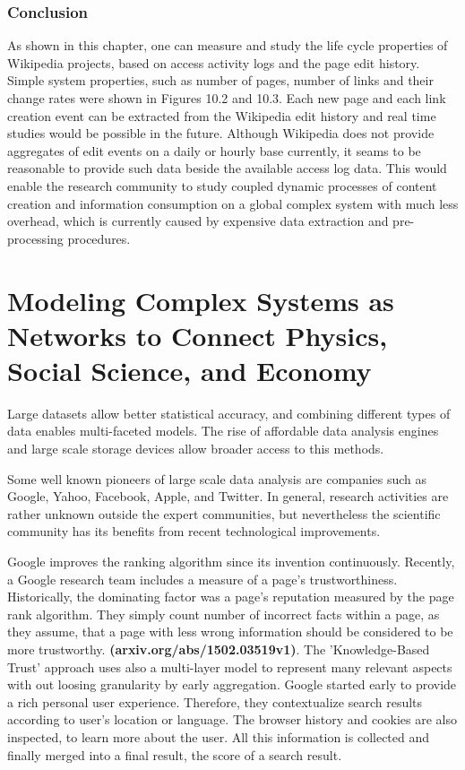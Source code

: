 \documentclass[a4paper,10pt]{scrbook}
\begin{document}
\subsection*{Conclusion}
As shown in this chapter, one can measure and study the life cycle properties of Wikipedia projects, based on access activity logs and the page edit history. Simple system properties, such as number of pages, number of links and their change rates were shown in Figures 10.2 and 10.3. Each new page and each link creation event can be extracted from the Wikipedia edit history and real time studies would be possible in the future. Although Wikipedia does not provide aggregates of edit events on a daily or hourly base currently, it seams to be reasonable to provide such data beside the available access log data. This would enable the  research community to study coupled dynamic processes of content creation and information consumption on a global complex system with much less overhead, which is currently caused by expensive data extraction and pre-processing procedures.   



\chapter{Modeling Complex Systems as Networks to Connect Physics, Social Science, and Economy}

Large datasets allow better statistical accuracy, and combining different types of data enables multi-faceted models. The rise of affordable data analysis engines and large scale storage devices allow broader access to this methods. 

Some well known pioneers of large scale data analysis are companies such as Google, Yahoo, Facebook, Apple, and Twitter. In general, research activities are rather unknown outside the expert communities, but nevertheless the scientific community has its benefits from recent technological improvements. 

Google improves the ranking algorithm since its invention continuously. Recently, a Google research team includes a measure of a page's trustworthiness. Historically, the dominating factor was a page's reputation measured by the page rank algorithm. They simply count number of incorrect facts within a page, as they assume, that a page with less wrong information should be considered to be more trustworthy. \textbf{(arxiv.org/abs/1502.03519v1)}. The 'Knowledge-Based Trust' approach uses also a multi-layer model to represent many relevant aspects with out loosing granularity by early aggregation. Google started early to provide a rich personal user experience. Therefore, they contextualize search results according to user's location or language. The browser history and cookies are also inspected, to learn more about the user. All this information is collected and finally merged into a final result, the score of a search result. 
\end{document}
